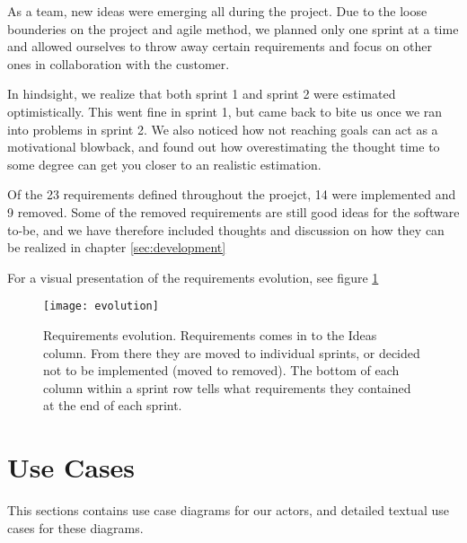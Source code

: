 \documentclass{report}
\begin{document}
\par As a team, new ideas were emerging all during the project. Due to the loose bounderies on the project and agile method, we planned only one sprint at a time and allowed ourselves to throw away certain requirements and focus on other ones in collaboration with the customer.
\par In hindsight, we realize that both sprint 1 and sprint 2 were estimated optimistically. This went fine in sprint 1, but came back to bite us once we ran into problems in sprint 2. We also noticed how not reaching goals can act as a motivational blowback, and found out how overestimating the thought time to some degree can get you closer to an realistic estimation.
\par Of the 23 requirements defined throughout the proejct, 14 were implemented and 9 removed. Some of the removed requirements are still good ideas for the software to-be, and we have therefore included thoughts and discussion on how they can be realized in chapter \ref{sec:development}
\par For a visual presentation of the requirements evolution, see figure \ref{fig:evolution}

\begin{figure}
    \centering
    \texttt{[image: evolution]}
    \caption{Requirements evolution. Requirements comes in to the Ideas column. From there they are moved to individual sprints, or decided not to be implemented (moved to removed). The bottom of each column within a sprint row tells what requirements they contained at the end of each sprint.}
    \label{fig:evolution}
\end{figure}






\section{Use Cases} \label{sec:use_cases}
This sections contains use case diagrams for our actors, and detailed textual use cases for these diagrams. 
\end{document}
